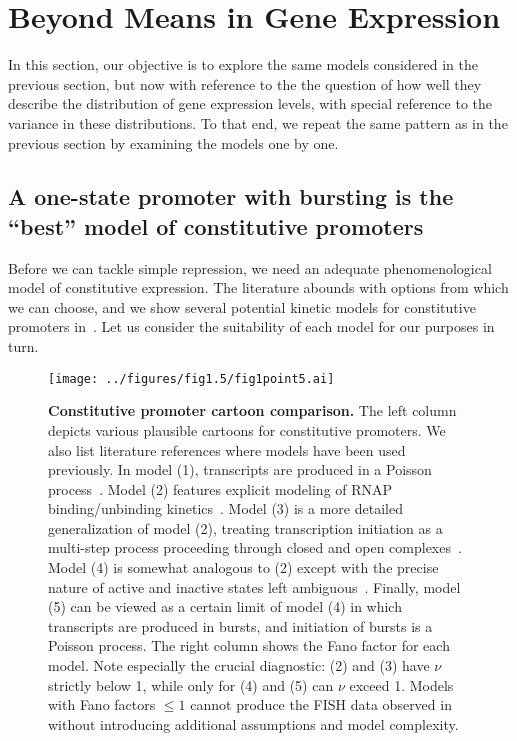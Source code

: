 \section{Beyond Means in Gene Expression}
 
In this section, our objective is to explore the same models considered in
the previous section, but now with reference to the the question of
how well they describe the distribution of gene expression levels, with
special reference to the variance in these distributions.  To that end,
we repeat the same pattern as in the previous section by examining
the models one by one.

\subsection{A one-state promoter with bursting is the ``best'' model of constitutive promoters}
Before we can tackle simple repression, we need an adequate phenomenological
model of constitutive expression. The literature abounds with options from which
we can choose, and we show several potential kinetic models for constitutive
promoters in~. Let us consider the suitability of each
model for our purposes in turn.

\begin{figure}%
\centering
\texttt{[image: ../figures/fig1.5/fig1point5.ai]}
\caption{\textbf{Constitutive promoter cartoon comparison.}
The left column depicts various plausible cartoons for constitutive promoters.
We also list literature references where models have been used previously. In
model (1), transcripts are produced in a Poisson process~\cite{Jones2014}. Model
(2) features explicit modeling of RNAP binding/unbinding
kinetics~\cite{Phillips2015a}. Model (3) is a more detailed generalization of
model (2), treating transcription initiation as a multi-step process proceeding
through closed and open complexes~\cite{Mitarai2015}. Model (4) is somewhat
analogous to (2) except with the precise nature of active and inactive states
left ambiguous~\cite{Razo-Mejia2020}. Finally, model (5) can be viewed as a
certain limit of model (4) in which transcripts are produced in bursts, and
initiation of bursts is a Poisson process.  The right column shows the
Fano factor for each model. Note especially the crucial diagnostic: (2) and (3)
have $\nu$ strictly below 1, while only for (4) and (5) can $\nu$ exceed 1.
Models with Fano factors $\le 1$ cannot produce the FISH data observed
in~\cite{Jones2014} without introducing additional assumptions and model
complexity.}
\label{fig:constit_cartoons}
\end{figure}


